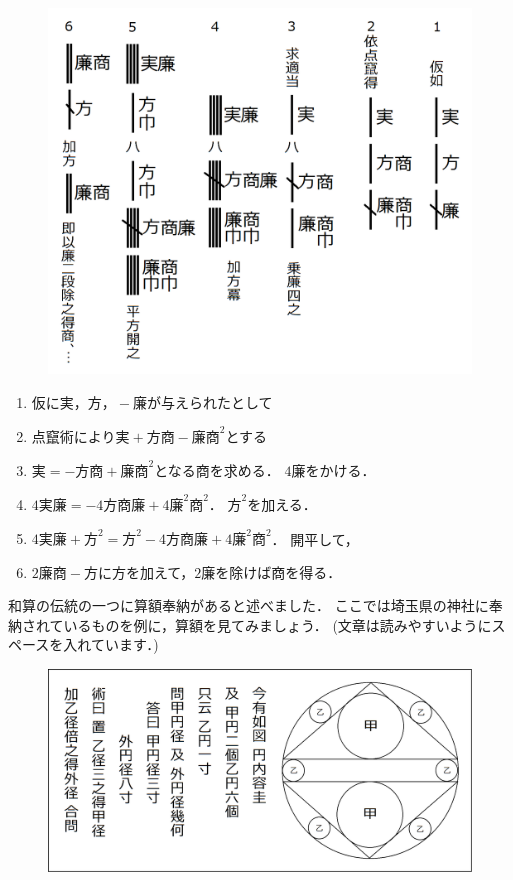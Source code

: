 \documentclass[./main]{subfiles}
\begin{document}
\begin{figure}[H]
\begin{center}
\includegraphics[width=13cm]{ookuwa2.png}
\end{center}
\end{figure}

\begin{enumerate}
\item 仮に$実，方，-廉$が与えられたとして
\item 点竄術により$実+方商-廉商^2$とする
\item $実=-方商+廉商^2$となる商を求める． $4廉$をかける．
\item $4実廉=-4方商廉+4 廉^2 商^2$． $方^2$を加える．
\item $4実廉+方^2 = 方^2 - 4方商廉 + 4 廉^2 商^2$． 開平して，
\item $2廉商-方$に方を加えて，$2廉$を除けば商を得る．
\end{enumerate}



和算の伝統の一つに算額奉納があると述べました． ここでは埼玉県の神社に奉納されているものを例に，算額を見てみましょう． (文章は読みやすいようにスペースを入れています．)

\begin{figure}[H]
\begin{center}
\includegraphics[width=13cm]{ookuwa3.png}
\end{center}
\end{figure}
\end{document}
